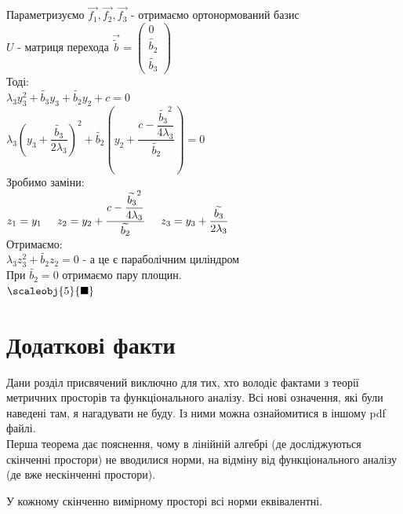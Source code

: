 Параметризуємо $\vec{f_1}, \vec{f_2}, \vec{f_3}$ - отримаємо ортонормований базис\\
$U$ - матриця перехода $\vec{\widetilde{b}} = \begin{pmatrix}
0 \\ \widetilde{b_2} \\ \widetilde{b_3}
\end{pmatrix}$\\
Тоді:\\
$\lambda_3 y_3^2 + \widetilde{b_3} y_3 + \widetilde{b_2} y_2 + c = 0$\\
$\lambda_3 \left(y_3 + \dfrac{\widetilde{b_3}}{2 \lambda_3} \right)^2 + \widetilde{b_2} \left(y_2 + \dfrac{c - \dfrac{\widetilde{b_3}^2}{4\lambda_3}}{\widetilde{b_2}} \right) = 0$\\
Зробимо заміни:\\
$z_1 = y_1 \hspace{0.5cm}
z_2 = y_2 + \dfrac{c - \dfrac{\widetilde{b_3}^2}{4\lambda_3}}{\widetilde{b_2}} \hspace{0.5cm}
z_3 = y_3 + \dfrac{\widetilde{b_3}}{2 \lambda_3}
$\\
Отримаємо:\\
$\lambda_3 z_3^2 + \widetilde{b_2} z_2 = 0$ - а це є параболічним циліндром\\
При $\widetilde{b_2} = 0$ отримаємо пару площин.\\
$\scaleobj{5}{\blacksquare}$
\fi

\iffalse
\section{Додаткові факти}
Дани розділ присвячений виключно для тих, хто володіє фактами з теорії метричних просторів та функціонального аналізу. Всі нові означення, які були наведені там, я нагадувати не буду. Із ними можна ознайомитися в іншому pdf файлі.
\bigskip \\
Перша теорема дає пояснення, чому в лінійній алгебрі (де досліджуються скінченні простори) не вводилися норми, на відміну від функціонального аналізу (де вже нескінченні простори).
\begin{theorem}
У кожному скінченно вимірному просторі всі норми еквівалентні.
\end{theorem}


